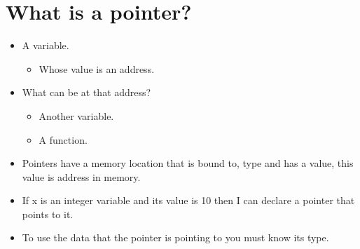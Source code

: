 \section{What is a pointer?}
\begin{itemize}
    \item A variable.
        \begin{itemize}
            \item Whose value is an address.
        \end{itemize}

    \item What can be at that address?
        \begin{itemize}
            \item Another variable.
            \item A function.
        \end{itemize}
    
    \item Pointers have a memory location that is bound to, type and has a value, this value is address in memory.
    \item If x is an integer variable and its value is 10 then I can declare a pointer that points to it.
    \item To use the data that the pointer is pointing to you must know its type.
\end{itemize}


